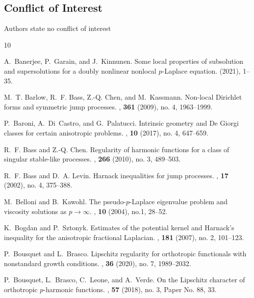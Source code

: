 \documentclass[11pt]{amsart}
\theoremstyle{plain}
\theoremstyle{definition}
\numberwithin{equation}{section}
\begin{document}
\subsection*{Conflict of Interest} 
Authors state no conflict of interest

%
%
\begin{thebibliography}{10}

A.~Banerjee, P.~Garain, and J.~Kinnunen.
\newblock Some local properties of subsolution and supersolutions for a doubly
  nonlinear nonlocal $p$-{L}aplace equation.
 (2021), 1--35.

M.~T. Barlow, R.~F. Bass, Z.-Q. Chen, and M.~Kassmann.
\newblock Non-local {D}irichlet forms and symmetric jump processes.
, \textbf{361} (2009), no. 4, 1963--1999.

P.~Baroni, A.~Di~Castro, and G.~Palatucci.
\newblock Intrinsic geometry and {D}e {G}iorgi classes for certain anisotropic
  problems.
, \textbf{10} (2017), no. 4, 647--659.

R.~F. Bass and Z.-Q. Chen.
\newblock Regularity of harmonic functions for a class of singular stable-like
  processes.
, \textbf{266} (2010), no. 3, 489--503.

R.~F. Bass and D.~A. Levin.
\newblock Harnack inequalities for jump processes.
, \textbf{17} (2002), no. 4, 375--388.

M.~Belloni and B.~Kawohl.
\newblock The pseudo-{$p$}-{L}aplace eigenvalue problem and viscosity solutions
  as {$p\to\infty$}.
, \textbf{10} (2004), no.1, 28--52.

K.~Bogdan and P.~Sztonyk.
\newblock Estimates of the potential kernel and {H}arnack's inequality for the
  anisotropic fractional {L}aplacian.
, \textbf{181} (2007), no. 2, 101--123.

P.~Bousquet and L.~Brasco.
\newblock Lipschitz regularity for orthotropic functionals with nonstandard
  growth conditions.
, \textbf{36} (2020), no. 7, 1989--2032.

P.~Bousquet, L.~Brasco, C.~Leone, and A.~Verde.
\newblock On the {L}ipschitz character of orthotropic {$p$}-harmonic functions.
, \textbf{57} (2018), no. 3, Paper No. 88,
  33.


\end{thebibliography}
\end{document}
